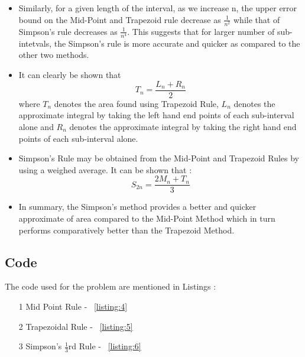 \documentclass[titlepage, 11pt]{article}
\begin{document}
\begin{itemize}
    \item Similarly, for a given length of the interval, as we increase n, the upper error bound on the Mid-Point and Trapezoid rule decrease as $\frac{1}{n^2}$ while that of Simpson's rule decreases as $\frac{1}{n^4}$. This suggests that for larger number of sub-intetvals, the Simpson's rule is more accurate and quicker as compared to the other two methods.
    \item It can clearly be shown that 
    \begin{equation}
        T_n = \frac{L_n+R_n}{2}
    \end{equation}
    where $T_n$ denotes the area found using Trapezoid Rule, $L_n$ denotes the approximate integral by taking the left hand end points of each sub-interval alone and $R_n$ denotes the approximate integral by taking the right hand end points of each sub-interval alone.
    \item Simpson's Rule may be obtained from the Mid-Point and Trapezoid Rules by using a weighed average. It can be shown that :
    \begin{equation}
        S_{2n} = \frac{2M_n+T_n}{3}
    \end{equation}
    \item In summary, the Simpson's method provides a better and quicker approximate of area compared to the Mid-Point Method which in turn performs comparatively better than the Trapezoid Method.
\end{itemize}


\subsection{Code}
The code used for the problem are mentioned in Listings : \begin{itemize}
    \item [1] Mid Point Rule - ~\ref{listing:4}
    \item [2] Trapezoidal Rule - ~\ref{listing:5}
    \item [3] Simpson's $\frac{1}{3}$rd Rule - ~\ref{listing:6}
\end{itemize}

\inputminted[breaklines,
 mathescape,
 linenos,
 numbersep=5pt,
 frame=single,
 numbersep=5pt,
 xleftmargin=0pt]{c}{P2MP.c}
\label{listing:4}
\inputminted[breaklines,
 mathescape,
 linenos,
 numbersep=5pt,
 frame=single,
 numbersep=5pt,
 xleftmargin=0pt]{c}{P2TP.c}
\label{listing:5}
\inputminted[breaklines,
 mathescape,
 linenos,
 numbersep=5pt,
 frame=single,
 numbersep=5pt,
 xleftmargin=0pt]{c}{P2SR.c}
\label{listing:6}
\end{document}
